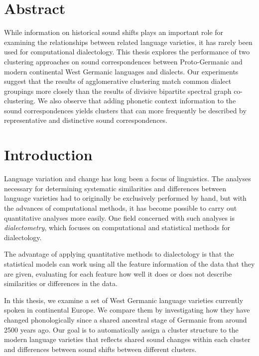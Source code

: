 \documentclass[a4paper]{article}
\begin{document}
\newpage

\section*{Abstract}
While information on historical sound shifts
plays an important role for examining
the relationships between related language varieties,
it has rarely been used for computational dialectology.
This thesis explores the performance of two clustering
approaches on sound correspondences between Proto-Germanic
and modern continental West Germanic languages and dialects.
Our experiments suggest that the results of agglomerative clustering
match common dialect groupings more closely
than the results of divisive bipartite spectral graph co-clustering.
We also observe that adding phonetic context information
to the sound correspondences yields clusters
that can more frequently be described by representative and distinctive
sound correspondences.

\newpage
\tableofcontents
\newpage
\listoftables
\listoffigures
\newpage


\section{Introduction}

Language variation and change has long been a focus of linguistics.
The analyses necessary for determining
systematic similarities and differences between language varieties
had to originally be exclusively performed by hand,
but with the advances of computational methods,
it has become possible to carry out quantitative analyses more easily.
One field concerned with such analyses is \textit{dialectometry},
which focuses on computational and statistical methods for dialectology.

The advantage of applying quantitative methods to dialectology
is that the statistical models can work using all the feature
information of the data that they are given, evaluating for
each feature how well it does or does not describe similarities or differences in the data.

In this thesis, we examine a set of West Germanic language varieties
currently spoken in continental Europe.
We compare them by investigating how they have changed phonologically
since a shared ancestral stage of Germanic from around 2500 years ago.
Our goal is to automatically assign a cluster structure to the
modern language varieties that reflects shared sound changes
within each cluster and differences between sound shifts between different clusters.
\end{document}
